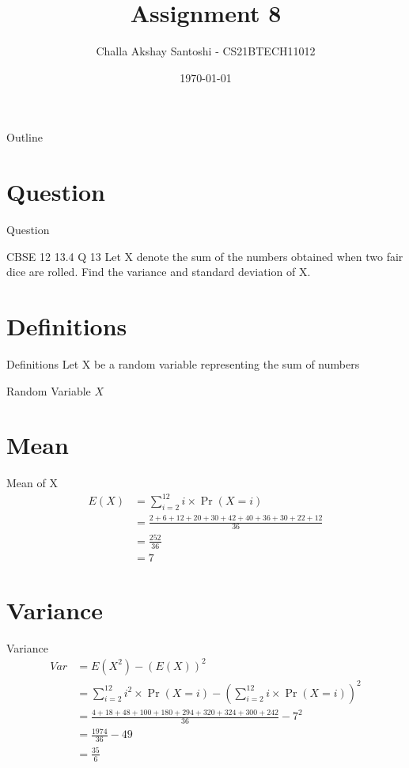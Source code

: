 \documentclass{beamer}
\title{Assignment 8}
\author{Challa Akshay Santoshi - CS21BTECH11012}
\date{\today}
\providecommand{\pr}[1]{\ensuremath{\Pr\left(#1\right)}}
\begin{document}
\begin{frame}
    \titlepage 
\end{frame}

\logo{}


\begin{frame}{Outline}
    \tableofcontents
\end{frame}


\section{Question}
\begin{frame}{Question}
\begin{block}{CBSE 12 13.4 Q 13} Let X denote the sum of the numbers obtained when two fair dice are rolled. Find the variance and standard deviation of X.
    \end{block}
\end{frame}

\section{Definitions}
\begin{frame}{Definitions}
Let X be a random variable representing the sum of numbers
   \begin{table}[ht!]
    \centering
    
    \caption{Random Variable $X$}
	\label{table:table1}
\end{table} 
\end{frame}

\section{Mean}
\begin{frame}{Mean of X}
\begin{align}
    E(X) &= \sum_{i=2}^{12} i\times \pr{X=i}\\
    &= \frac{2+6+12+20+30+42+40+36+30+22+12}{36}\\
    &= \frac{252}{36}\\
    &= 7
\end{align}
\end{frame}

\section{Variance}
\begin{frame}{Variance}
\begin{align}
    Var &= E(X^2) - (E(X))^2\\
    &= \sum_{i=2}^{12} i^2\times \pr{X=i} - (\sum_{i=2}^{12} i\times \pr{X=i})^2\\
    &= \frac{4+18+48+100+180+294+320+324+300+242}{36} - 7^2\\
    &= \frac{1974}{36} - 49\\
    &= \frac{35}{6}
\end{align}
\end{frame}
\end{document}
